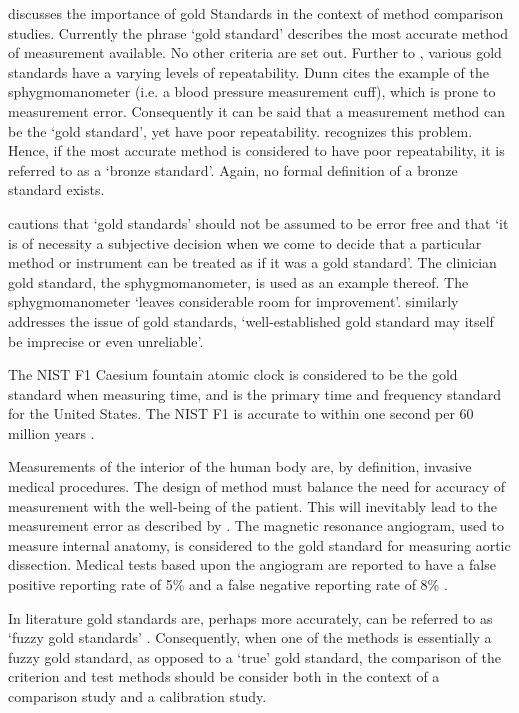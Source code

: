 \citet{Aroy2015} discusses the importance of gold Standards in the context of method comparison studies.
			Currently the phrase `gold standard' describes the most accurate method of measurement available. No other criteria are set out. Further to \citet{DunnSEME}, various gold standards have a varying levels of repeatability. Dunn cites the example of the sphygmomanometer (i.e. a blood pressure measurement cuff), which is prone to measurement error. Consequently it can be said that a measurement method can be the `gold standard', yet have poor repeatability. \citet{DunnSEME} recognizes this problem. Hence, if the most accurate method is considered to have poor repeatability, it is referred to as a `bronze standard'.  Again, no formal definition of a bronze standard exists.
		
	
		
	\citet[p.47]{DunnSEME} cautions that `gold standards' should not be
	assumed to be error free and that `it is of necessity a subjective
	decision when we come to decide that a particular method or
	instrument can be treated as if it was a gold standard'. The
	clinician gold standard, the sphygmomanometer, is used as an
	example thereof.  The sphygmomanometer `leaves considerable room
	for improvement'. \citet{pizzi} similarly addresses the issue of gold standards, `well-established gold
	standard may itself be imprecise or even unreliable'.
	
	
The NIST F1 Caesium fountain atomic clock is considered to be the gold standard when measuring time, and is the primary time and
	frequency standard for the United States. The NIST F1 is accurate to within one second per 60 million years \citep{NIST}.
	
Measurements of the interior of the human body are, by definition,
	invasive medical procedures. The design of method must balance the need for accuracy of measurement with the well-being of the	patient. This will inevitably lead to the measurement error as described by \citet{DunnSEME}. The magnetic resonance angiogram,
	used to measure internal anatomy, is considered to the gold	standard for measuring aortic dissection. Medical tests based upon
	the angiogram are reported to have a false positive reporting rate
	of 5\% and a false negative reporting rate of 8\% \citep{ACR}.
	
In literature gold standards are, perhaps more accurately, can be referred to as
	`fuzzy gold standards' \citep{phelps}. Consequently, when one of the methods is
	essentially a fuzzy gold standard, as opposed to a `true' gold standard, the comparison of the criterion and test methods should
	be consider both in the context of a comparison study and a	calibration study.
	
